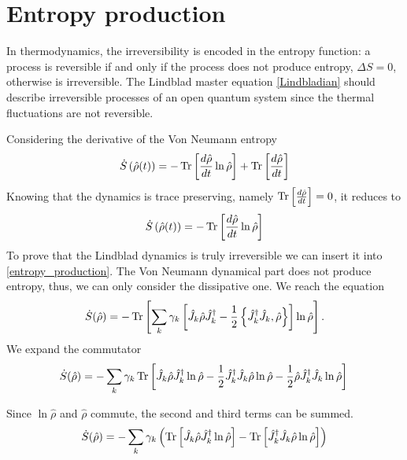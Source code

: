 \section{Entropy production}

In thermodynamics, the irreversibility is encoded in the entropy function: a process is reversible if and only if the process does not produce entropy, $\Delta S = 0$, otherwise is irreversible. 
The Lindblad master equation \eqref{Lindbladian} should describe irreversible processes of an open quantum system since the thermal fluctuations are not reversible. 

Considering the derivative of the Von Neumann entropy
\begin{equation}
    \dot S\left(\hat\rho(t)\right) = -\operatorname{Tr}\left[\frac{d\hat\rho}{dt}\ln\hat\rho\right] + \operatorname{Tr}\left[\frac{d\hat\rho}{dt}\right]
\end{equation}
Knowing that the dynamics is trace preserving, namely $\operatorname{Tr}\left[\frac{d\hat\rho}{dt}\right] = 0$, it reduces to
\begin{equation}\label{entropy_production}
    \dot S\left(\hat\rho(t)\right) = -\operatorname{Tr}\left[\frac{d\hat\rho}{dt}\ln\hat\rho\right] 
\end{equation} 
To prove that the Lindblad dynamics is truly irreversible we can insert it into \eqref{entropy_production}. The Von Neumann dynamical part does not produce entropy, thus, we can only consider the dissipative one. We reach the equation
\begin{equation}
    \dot S(\hat\rho) = -\operatorname{Tr}\left[\sum_{k}\gamma_{k}\left[\hat J_{k} \hat\rho\hat J_{k}^\dagger -\frac{1}{2} \left\{ \hat J_{k}^\dagger \hat J_{k}, \hat\rho\right\}\right]\ln\hat\rho\right].
\end{equation}
We expand the commutator
\begin{equation}
    \dot S(\hat\rho) =-\sum_{k}\gamma_{k}\operatorname{Tr}\left[\hat J_{k} \hat\rho\hat J_{k}^\dagger\ln\hat\rho -\frac{1}{2}\hat J_{k}^\dagger \hat J_{k}\hat\rho \ln\hat\rho-\frac{1}{2} \hat\rho\hat J_{k}^\dagger \hat J_{k}\ln\hat\rho\right]\\
\end{equation}
        
Since $\ln\hat\rho$ and $\hat\rho$ commute, the second and third terms can be summed.
\begin{equation}\label{Lindbladian_entropy_production}
    \dot S(\hat\rho) =  -\sum_{k}\gamma_{k}\left(\operatorname{Tr}\left[\hat J_{k} \hat\rho\hat J_{k}^\dagger\ln\hat\rho\right]-\operatorname{Tr}\left[\hat J_{k}^\dagger \hat J_{k}\hat\rho\ln\hat\rho\right]\right)
\end{equation}

